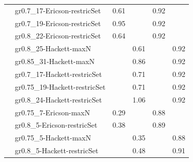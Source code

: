 \begin{footnotesize}
\begin{longtable}{@{}ll|rr|rr@{}}
 & gr0.7\_17-Ericson-restricSet & 0.61 &      & 0.92 &     \\
 & gr0.7\_19-Ericson-restricSet & 0.95 &      & 0.92 &     \\
 & gr0.8\_22-Ericson-restricSet & 0.64 &      & 0.92 &     \\
 & gr0.8\_25-Hackett-maxN &      & 0.61 &      & 0.92\\
 & gr0.85\_31-Hackett-maxN &      & 0.86 &      & 0.92\\
 & gr0.7\_17-Hackett-restricSet &      & 0.71 &      & 0.92\\
 & gr0.75\_19-Hackett-restricSet &      & 0.71 &      & 0.92\\
 & gr0.8\_24-Hackett-restricSet &      & 1.06 &      & 0.92\\
\addlinespace
\multirow{4}{*}{Lifelong prod.} & gr0.75\_7-Ericson-maxN & 0.29 &      & 0.88 &     \\
 & gr0.8\_5-Ericson-restricSet & 0.38 &      & 0.89 &     \\
 & gr0.75\_5-Hackett-maxN &      & 0.35 &      & 0.88\\
 & gr0.8\_5-Hackett-restricSet &      & 0.48 &      & 0.91\\
\bottomrule
\end{longtable}
\end{footnotesize}
\clearpage%


